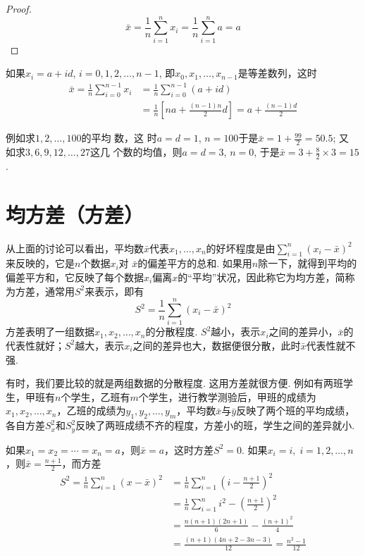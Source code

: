 \begin{proof}
    $$\bar{x}= \frac{1}{n}\sum_{i=1}^{n}x_{i}= \frac{1}{n}\sum_{i= 1}^{n}a= a$$
\end{proof}

\begin{example}
    如果$x_i=a+id$, $i=0,1,2,\ldots,n-1$,
即$x_0,x_1,\ldots,x_{n-1}$是等差数列，这时
\[\begin{split}
   \bar{x}= \frac {1}{n}\sum _{i= 0}^{n-1}x_{i}&= \frac{1}{n}\sum_{i= 0}^{n- 1}( a+ id) \\
   &= \frac{1}{n}\left [ na+ \frac {(  n- 1 )n}{2}d \right ]=  a+\frac{(n-1)d}{2}
\end{split}\]
\end{example}
例如求$1,2,\ldots, 100$的平均 数，这 时$a=d=1$, $n=100$于是$\bar{x} = 1+ \frac {99}{2}= 50.5$; 又 如求$3, 6, 9, 12, \ldots, 27 $这几 个数的均值，则$a= d= 3$, $n= 0$, 于是$\bar{x}=3+\frac{8}{2}\times 3=15$.


\section*{均方差（方差）}

从上面的讨论可以看出，平均数$\bar x$代表$x_1,\ldots,x_n$的好坏程度是由$\sum\limits^n_{i=1}(x_i-\bar x)^2$来反映的，它是$n$个数据$x_i$对
$\bar x$的偏差平方的总和. 如果用$n$除一下，就得到平均的偏差平方和，它反映了每个数据$x_i$偏离$x$的“平均”状况，因此称它为均方差，简称为方差，通常用$S^2$来表示，即有
\[S^2=\frac{1}{n}\sum^n_{i=1}(x_i-\bar x)^2\]
方差表明了一组数据$x_1,x_2,\ldots,x_n$的分散程度. $S^2$越小，表示$x_i$之间的差异小，$\bar x$的代表性就好；$S^2$越大，表示$x_i$之间的差异也大，数据便很分散，此时$\bar x$代表性就不强.

有时，我们要比较的就是两组数据的分散程度. 这用方差就很方便. 例如有两班学生，甲班有$n$个学生，乙班有$m$个学生，进行教学测验后，甲班的成绩为$x_1,x_2,\ldots,x_n$，乙班的成绩为$y_1,y_2,\ldots,y_m$，平均数$\bar x$与$\bar y$反映了两个班的平均成绩，各自方差$S^2_x$和$S^2_y$反映了两班成绩不齐的程度，方差小的班，学生之间的差异就小.

如果$x_1=x_2=\cdots=x_n=a$，则$\bar x=a$，这时方差$S^2=0$. 如果$x_i=i,\; i=1,2,\ldots,n$，则$\bar x=\frac{n+1}{2}$，而方差
\[\begin{split}
    S^2=\frac{1}{n}\sum^n_{i=1}(x-\bar x)^2 &=\frac{1}{n}\sum^n_{i=1}\left(i-\frac{n+1}{2}\right)^2\\
&=\frac{1}{n}\sum^n_{i=1}i^2-\left(\frac{n+1}{2}\right)^2\\
&=\frac{n(n+1)(2n+1)}{6}-\frac{(n+1)^2}{4}\\
&=\frac{(n+1)(4n+2-3n-3)}{12}=\frac{n^2-1}{12}
\end{split}\]

